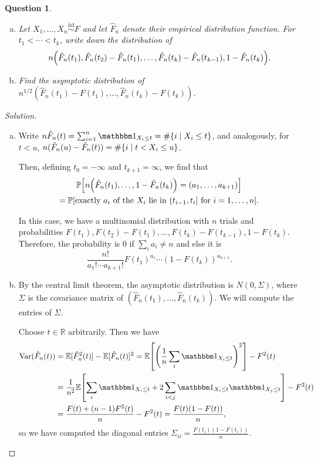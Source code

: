 \documentclass{article}
\theoremstyle{plain}
\newtheorem{question}{Question}
\theoremstyle{remark}
\newenvironment{solution}{\begin{proof}[Solution]\renewcommand\qedsymbol{}}{\end{proof}}
\newcommand{\Bb}{\mathbb}
\newcommand{\Rm}{\mathrm}
\newcommand{\PP}{\Bb P}
\newcommand{\RR}{\Bb R}
\newcommand{\EE}{\Bb E}
\newcommand\ind{\mathbbm 1} %
\newcommand\iid{\overset{\Rm{iid}}{\sim}}
\DeclareMathOperator{\Var}{Var}
\begin{document}
\begin{question}
	\begin{enumerate}[(a)]
		\item Let $X_1, \dotsc, X_n \iid F$ and let $\hat F_n$ denote their empirical distribution function. For $t_1 < \dotsb < t_k$, write down the distribution of 
		\[
		n\qty(\hat F_n(t_1), \hat F_n(t_2) - \hat F_n(t_1), \dotsc, \hat F_n(t_k) - \hat F_n(t_{k-1}), 1 - \hat F_n(t_k)). 
		\]
		\item Find the asymptotic distribution of $n^{1/2} (\hat F_n(t_1) - F(t_1), \dotsc, \hat F_n(t_k) - F(t_k))$. 
	\end{enumerate}
\end{question}

\begin{solution}
	\begin{enumerate}[(a)] \item
	Write $n \hat F_n(t) = \sum_{i=1}^n \ind_{X_i \leq t} = \# \qty{i \mid X_i \leq t}$, and analogously, for $t < u$, 
	$n (\hat F_n(u) - \hat F_n(t)) = \#\qty{i \mid t < X_i \leq u}$. 
	
	Then, defining $t_0 = -\infty$ and $t_{k+1} = \infty$,  we find that
	\begin{gather*}
	\PP\qty[ n \qty(\hat F_n(t_1), \dotsc, 1 - \hat F_n(t_k)) = (a_1, \dotsc, a_{k+1})] \\ = \PP[\text{exactly $a_i$ of the $X_i$ lie in $(t_{i-1}, t_i]$ for $i = 1, \dotsc, n$}].
	\end{gather*}

In this case, we have a multinomial distribution with $n$ trials and probabilities $F(t_1), F(t_2) - F(t_1), \dotsc, F(t_k) - F(t_{k-1}), 1 - F(t_k)$. Therefore, the probability is 0 if $\sum_i a_i \neq n$ and else it is
\[
\frac{n!}{a_1! \dotsb a_{k+1}!} F(t_1)^{a_1} \dotsb (1 - F(t_k))^{a_{k+1}}. 
\]

\item By the central limit theorem, the asymptotic distribution is $N(0, \Sigma)$, where $\Sigma$ is the covariance matrix of $(\hat F_n(t_1), \dotsc, \hat F_n(t_k))$. We will compute the entries of $\Sigma$. 

Choose $t \in \RR$ arbitrarily. Then we have
\begin{align*}
	\Var(\hat F_n(t)) &= \EE[\hat F_n^2(t)] - \EE[\hat F_n(t)]^2 = \EE\qty[\qty(\frac1n\sum_i \ind_{X_i \leq t})^2] - F^2(t) \\
	&= \frac1{n^2}\EE\qty[\sum_i \ind_{X_i \leq t} + 2\sum_{i < j} \ind_{X_i \leq t} \ind_{X_j \leq t}] - F^2(t) \\
	&= \frac{F(t) + (n-1) F^2(t)}{n} - F^2(t) = \frac{F(t)(1 - F(t))}{n},
\end{align*}
so we have computed the diagonal entries $\Sigma_{ii} = \frac{F(t_i)(1 - F(t_i))}{n}$. 


\end{enumerate}
\end{solution}
\end{document}
